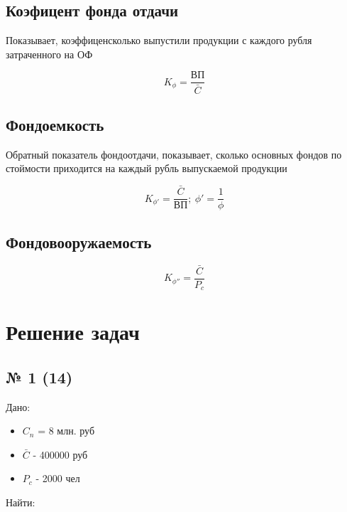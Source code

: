 \documentclass[11pt]{article}
\begin{document}
\subsection{Коэфицент фонда отдачи}
\label{sec:orga1d4aa1}

Показывает, коэффиценсколько выпустили продукции с каждого рубля затраченного на ОФ


\begin{equation}
  K_{\phi} = \frac{\text{ВП}}{\bar{C}}
\end{equation}

\subsection{Фондоемкость}
\label{sec:org2439a71}

Обратный показатель фондоотдачи, показывает, сколько основных фондов по стоймости приходится на каждый рубль выпускаемой продукции


\begin{equation}
  K_{\phi'} = \frac{\bar{C}}{\text{ВП}}; \ \phi' = \frac{1}{\phi}
\end{equation}


\subsection{Фондовооружаемость}
\label{sec:org1479971}

\begin{equation}
  K_{\phi''} = \frac{\bar{C}}{P_{c}}
\end{equation}

\section{Решение задач}
\label{sec:orgf394acf}
\subsection{№ 1 (14)}
\label{sec:orgdace21d}

Дано:

\begin{itemize}
\item \(C_{n}\) = 8 млн. руб
\item \(\bar{C}\) - 400000 руб
\item \(P_{c}\) - 2000 чел
\end{itemize}

Найти:
\end{document}
